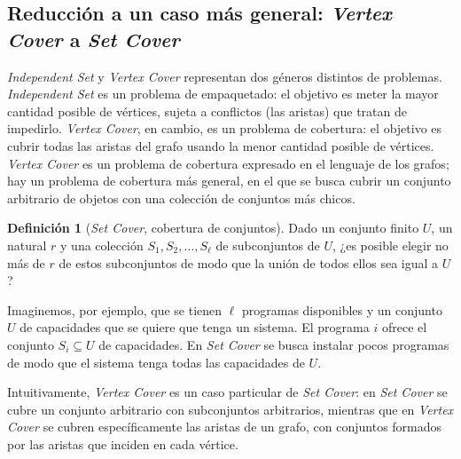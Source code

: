 \documentclass[12pt, spanish, oneside, openany]{book}
\newcommand{\prob}[1]{\textit{#1}}
\newcommand{\IS}{\prob{Independent Set}\xspace}
\newcommand{\VC}{\prob{Vertex Cover}\xspace}
\newcommand{\SC}{\prob{Set Cover}\xspace}
\theoremstyle{uprightplain}
\theoremstyle{definition}
\newtheorem{definicion}[teorema]{Definición}
\theoremstyle{remark}
\theoremstyle{definition}
\begin{document}
\subsection{\texorpdfstring{Reducción a un caso más general: \prob{Vertex Cover} a \prob{Set Cover}}{Reducción a un caso más general: Vertex Cover a Set Cover}}
\label{subsec:np-set-cover}

\IS y \VC representan dos géneros distintos de problemas. \IS es un problema de empaquetado: el objetivo es meter la mayor cantidad posible de vértices, sujeta a conflictos (las aristas) que tratan de impedirlo. \VC, en cambio, es un problema de cobertura: el objetivo es cubrir todas las aristas del grafo usando la menor cantidad posible de vértices. \VC es un problema de cobertura expresado en el lenguaje de los grafos; hay un problema de cobertura más general, en el que se busca cubrir un conjunto arbitrario de objetos con una colección de conjuntos más chicos.

\begin{definicion}[\SC, cobertura de conjuntos]
\label{def:np-sc}
Dado un conjunto finito $U$, un natural $r$ y una colección $S_1,S_2,\dots,S_\ell$ de subconjuntos de $U$, ¿es posible elegir no más de $r$ de estos subconjuntos de modo que la unión de todos ellos sea igual a $U$?
\end{definicion}

Imaginemos, por ejemplo, que se tienen $\ell$ programas disponibles y un conjunto $U$ de capacidades que se quiere que tenga un sistema. El programa $i$ ofrece el conjunto $S_i\subseteq U$ de capacidades. En \SC se busca instalar pocos programas de modo que el sistema tenga todas las capacidades de $U$.

Intuitivamente, \VC es un caso particular de \SC: en \SC se cubre un conjunto arbitrario con subconjuntos arbitrarios, mientras que en \VC se cubren específicamente las aristas de un grafo, con conjuntos formados por las aristas que inciden en cada vértice.
\end{document}
